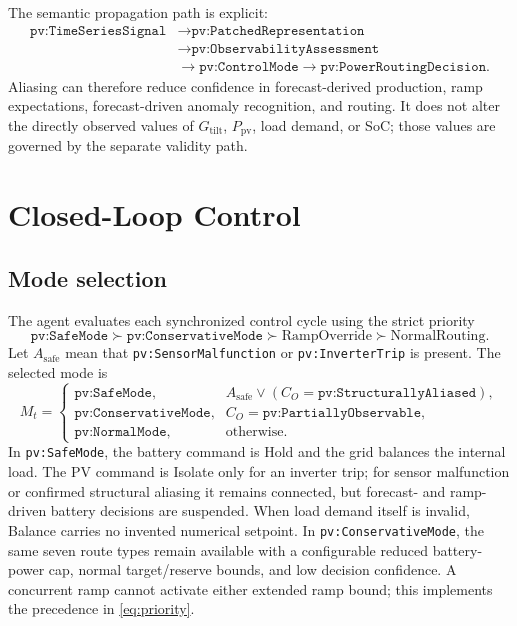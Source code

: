 \documentclass[
	letterpaper,
	10pt,
	unnumberedsections,
	twoside,
]{LTJournalArticle}
\newcommand{\pv}[1]{\texttt{pv:#1}}
\newcommand{\valueof}[1]{\texttt{pv:#1}}
\begin{document}
The semantic propagation path is explicit:
\begin{equation}
\begin{aligned}
\pv{TimeSeriesSignal}
&\longrightarrow \pv{PatchedRepresentation}\\
&\longrightarrow \pv{ObservabilityAssessment}\\
&\longrightarrow \pv{ControlMode}
\longrightarrow \pv{PowerRoutingDecision}.
\end{aligned}
\label{eq:semantic-path}
\end{equation}
Aliasing can therefore reduce confidence in forecast-derived production, ramp expectations, forecast-driven anomaly recognition, and routing. It does not alter the directly observed values of $G_{\mathrm{tilt}}$, $P_{\mathrm{pv}}$, load demand, or SoC; those values are governed by the separate validity path.

\section{Closed-Loop Control}

\subsection{Mode selection}

The agent evaluates each synchronized control cycle using the strict priority
\begin{equation}
\label{eq:priority}
\valueof{SafeMode}\succ
\valueof{ConservativeMode}\succ
\mathrm{RampOverride}\succ
\mathrm{NormalRouting}.
\end{equation}
Let $A_{\mathrm{safe}}$ mean that \valueof{SensorMalfunction} or \valueof{InverterTrip} is present. The selected mode is
\begin{equation}
\label{eq:mode-selection}
M_t=
\begin{cases}
\valueof{SafeMode}, & A_{\mathrm{safe}}\vee
(C_O=\valueof{StructurallyAliased}),\\
\valueof{ConservativeMode}, & C_O=\valueof{PartiallyObservable},\\
\valueof{NormalMode}, & \text{otherwise}.
\end{cases}
\end{equation}
In \valueof{SafeMode}, the battery command is Hold and the grid balances the internal load. The PV command is Isolate only for an inverter trip; for sensor malfunction or confirmed structural aliasing it remains connected, but forecast- and ramp-driven battery decisions are suspended. When load demand itself is invalid, Balance carries no invented numerical setpoint. In \valueof{ConservativeMode}, the same seven route types remain available with a configurable reduced battery-power cap, normal target/reserve bounds, and low decision confidence. A concurrent ramp cannot activate either extended ramp bound; this implements the precedence in \autoref{eq:priority}.
\end{document}
